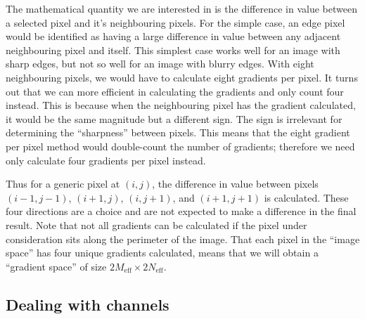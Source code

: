 \documentclass[11pt]{article}
\begin{document}
The mathematical quantity we are interested in is the difference in value between a selected pixel and it's neighbouring pixels. For the simple case, an edge pixel would be identified as having a large difference in value between any adjacent neighbouring pixel and itself. This simplest case works well for an image with sharp edges, but not so well for an image with blurry edges. With eight neighbouring pixels, we would have to calculate eight gradients per pixel. It turns out that we can more efficient in calculating the gradients and only count four instead. This is because when the neighbouring pixel has the gradient calculated, it would be the same magnitude but a different sign. The sign is irrelevant for determining the ``sharpness'' between pixels. This means that the eight gradient per pixel method would double-count the number of gradients; therefore we need only calculate four gradients per pixel instead.

Thus for a generic pixel at $(i,j)$, the difference in value between pixels $(i-1,j-1)$, $(i+1,j)$, $(i,j+1)$, and $(i+1,j+1)$ is calculated. These four directions are a choice and are not expected to make a difference in the final result. Note that not all gradients can be calculated if the pixel under consideration sits along the perimeter of the image. That each pixel in the ``image space'' has four unique gradients calculated, means that we will obtain a ``gradient space'' of size $2M_{\text{eff}} \times 2N_{\text{eff}}$.

\subsection{Dealing with channels}
\end{document}
